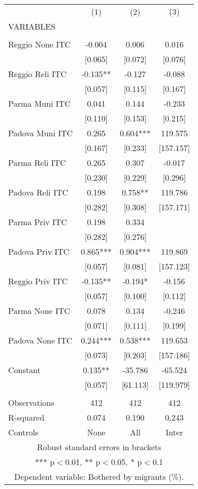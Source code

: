 \begin{tabular}{lccc} \hline
 & (1) & (2) & (3) \\
VARIABLES &  &  &  \\ \hline
 &  &  &  \\
Reggio None ITC & -0.004 & 0.006 & 0.016 \\
 & [0.065] & [0.072] & [0.076] \\
Reggio Reli ITC & -0.135** & -0.127 & -0.088 \\
 & [0.057] & [0.115] & [0.167] \\
Parma Muni ITC & 0.041 & 0.144 & -0.233 \\
 & [0.110] & [0.153] & [0.215] \\
Padova Muni ITC & 0.265 & 0.604*** & 119.575 \\
 & [0.167] & [0.233] & [157.157] \\
Parma Reli ITC & 0.265 & 0.307 & -0.017 \\
 & [0.230] & [0.229] & [0.296] \\
Padova Reli ITC & 0.198 & 0.758** & 119.786 \\
 & [0.282] & [0.308] & [157.171] \\
Parma Priv ITC & 0.198 & 0.334 &  \\
 & [0.282] & [0.276] &  \\
Padova Priv ITC & 0.865*** & 0.904*** & 119.869 \\
 & [0.057] & [0.081] & [157.123] \\
Reggio Priv ITC & -0.135** & -0.194* & -0.156 \\
 & [0.057] & [0.100] & [0.112] \\
Parma None ITC & 0.078 & 0.134 & -0.246 \\
 & [0.071] & [0.111] & [0.199] \\
Padova None ITC & 0.244*** & 0.538*** & 119.653 \\
 & [0.073] & [0.203] & [157.186] \\
Constant & 0.135** & -35.786 & -65.524 \\
 & [0.057] & [61.113] & [119.979] \\
 &  &  &  \\
Observations & 412 & 412 & 412 \\
R-squared & 0.074 & 0.190 & 0.243 \\
 Controls & None & All & Inter \\ \hline
\multicolumn{4}{c}{ Robust standard errors in brackets} \\
\multicolumn{4}{c}{ *** p$<$0.01, ** p$<$0.05, * p$<$0.1} \\
\multicolumn{4}{c}{ Dependent variable: Bothered by migrants (\%).} \\
\end{tabular}
